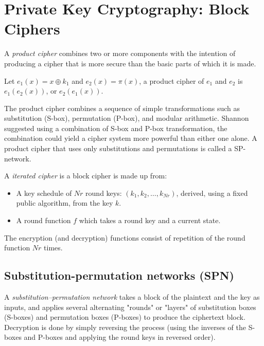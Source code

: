\section{Private Key Cryptography: Block Ciphers}
\begin{definition}
    A \textit{product cipher} combines two or more components with the intention of producing a cipher that is more secure than the basic parts of which it is made.
\end{definition}
\begin{example}
    Let $e_1(x) = x \oplus k_1$ and $e_2(x) = \pi(x)$,
    a product cipher of $e_1$ and $e_2$ is $e_1(e_2(x))$, or $e_2(e_1(x))$.
\end{example}

The product cipher combines a sequence of simple
transformations such as substitution (S-box),
permutation (P-box),
and modular arithmetic.
Shannon suggested using a combination of S-box and P-box transformation,
the combination could yield a cipher system more powerful than either one alone.
A product cipher that uses only substitutions and permutations is called a SP-network.

\begin{definition}
    A \textit{iterated cipher} is a block cipher is made up from:
    \begin{itemize}
        \item A key schedule of $Nr$ round keys: $(k_1, k_2, \dots, k_{Nr})$, derived, using a fixed public algorithm, from the key $k$.
        \item A round function $f$ which takes a round key and a current state.
    \end{itemize}
    The encryption (and decryption) functions consist of repetition of the round function $Nr$ times.
\end{definition}

\subsection{Substitution-permutation networks (SPN)}
\begin{definition}
    A \textit{substitution–permutation network}
    takes a block of the plaintext and the key as inputs,
    and applies several alternating "rounds" or "layers" of
    substitution boxes (S-boxes) and permutation boxes (P-boxes)
    to produce the ciphertext block.\\

    Decryption is done by simply reversing the process
    (using the inverses of the S-boxes and P-boxes and applying the round keys in reversed order).
\end{definition}

